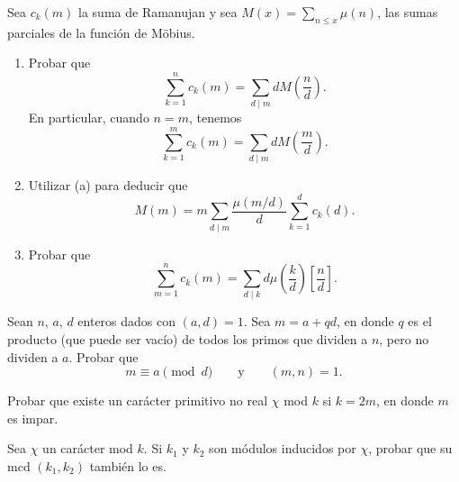 \documentclass[12pt,a4paper]{book}
\begin{document}
    \begin{ejercicio}
        Sea $c_{k}(m)$ la suma de Ramanujan y sea $M(x)=\sum_{n\leq x}\mu(n)$, las sumas
        parciales de la función de Möbius.
        \begin{enumerate}
            \item[(a)] Probar que
            \begin{equation*}
                \sum_{k=1}^{n}c_{k}(m)=\sum_{d\mid m}dM\left(\frac{n}{d}\right).
            \end{equation*}
            En particular, cuando $n=m$, tenemos
            \begin{equation*}
                \sum_{k=1}^{m}c_{k}(m)=\sum_{d\mid m}dM\left(\frac{m}{d}\right).
            \end{equation*}
            \item[(b)] Utilizar (a) para deducir que
            \begin{equation*}
                M(m)=m\sum_{d\mid m}\frac{\mu(m/d)}{d}\sum_{k=1}^{d}c_{k}(d).
            \end{equation*}
            \item[(c)] Probar que
            \begin{equation*}
                \sum_{m=1}^{n}c_{k}(m)=\sum_{d\mid k}d\mu\left(\frac{k}{d}\right)\left[\frac{n}{d}\right].
            \end{equation*}
        \end{enumerate}
    \end{ejercicio}

    \begin{ejercicio}
        Sean $n$, $a$, $d$ enteros dados con $(a,d)=1$. Sea $m=a+qd$, en donde $q$ es el
        producto (que puede ser vacío) de todos los primos que dividen a $n$, pero no dividen
        a $a$. Probar que
        \begin{equation*}
            m\equiv a\pmod{d}\qquad\text{y}\qquad(m,n)=1.
        \end{equation*}
    \end{ejercicio}

    \begin{ejercicio}
        Probar que existe un carácter primitivo no real $\chi$ mod $k$ si $k=2m$, en donde
        $m$ es impar.
    \end{ejercicio}

    \begin{ejercicio}
        Sea $\chi$ un carácter mod $k$. Si $k_{1}$ y $k_{2}$ son módulos inducidos por $\chi$,
        probar que su mcd $(k_{1},k_{2})$ también lo es.
    \end{ejercicio}
\end{document}
